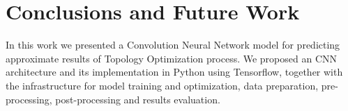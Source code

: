 
\chapter{Conclusions and Future Work}
\label{chapter:Conclusion}

In this work we presented a Convolution Neural Network model for predicting approximate results of Topology Optimization process.
We proposed an CNN architecture and its implementation in Python using Tensorflow, together with the infrastructure for model  training and optimization, data preparation, pre-processing, post-processing and results evaluation.
